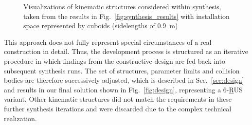 \documentclass[runningheads]{llncs}
\begin{document}
% 
\begin{figure}[tb]
	\centering
	
	\caption{Visualizations of kinematic structures considered within synthesis, taken from the results in Fig.~\ref{fig:synthesis_results} with installation space represented by cuboids (sidelengths of \SI{0.9}{\metre})}
	\label{fig:robots}
	\vspace{-5mm}
\end{figure}

This approach does not fully represent special circumstances of a real construction in detail. 
Thus, the development process is structured as an iterative procedure in which findings from the constructive design are fed back into subsequent synthesis runs. 
The set of structures, parameter limits and collision bodies are therefore successively adjusted, which is described in Sec.~\ref{sec:design} and results in our final solution shown in Fig.~\ref{fig:design}, representing a 6-\underline{R}US variant. 
Other kinematic structures did not match the requirements in these further synthesis iterations and were discarded due to the complex technical realization.
\end{document}
